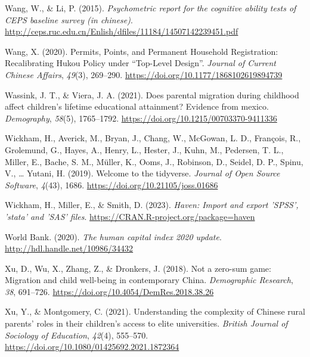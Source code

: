 \documentclass[
  man,floatsintext]{apa7}
\newlength{\cslhangindent}
\newlength{\cslentryspacingunit} %
\newenvironment{CSLReferences}[2] %
 {%
  \setlength{\parindent}{0pt}
  \ifodd #1
  \let\oldpar\par
  \def\par{\hangindent=\cslhangindent\oldpar}
  \fi
  \setlength{\parskip}{#2\cslentryspacingunit}
 }%
 {}
\begin{document}
\begin{CSLReferences}{1}{0}
\leavevmode{}%
Wang, W., \& Li, P. (2015). \emph{Psychometric report for the cognitive ability tests of CEPS baseline survey (in chinese)}. \url{http://ceps.ruc.edu.cn/Enlish/dfiles/11184/14507142239451.pdf}

\leavevmode{}%
Wang, X. (2020). Permits, Points, and Permanent Household Registration: Recalibrating Hukou Policy under {``}Top-Level Design{''}. \emph{Journal of Current Chinese Affairs}, \emph{49}(3), 269--290. \url{https://doi.org/10.1177/1868102619894739}

\leavevmode{}%
Wassink, J. T., \& Viera, J. A. (2021). Does parental migration during childhood affect children's lifetime educational attainment? Evidence from mexico. \emph{Demography}, \emph{58}(5), 1765--1792. \url{https://doi.org/10.1215/00703370-9411336}

\leavevmode{}%
Wickham, H., Averick, M., Bryan, J., Chang, W., McGowan, L. D., François, R., Grolemund, G., Hayes, A., Henry, L., Hester, J., Kuhn, M., Pedersen, T. L., Miller, E., Bache, S. M., Müller, K., Ooms, J., Robinson, D., Seidel, D. P., Spinu, V., \ldots{} Yutani, H. (2019). Welcome to the {tidyverse}. \emph{Journal of Open Source Software}, \emph{4}(43), 1686. \url{https://doi.org/10.21105/joss.01686}

\leavevmode{}%
Wickham, H., Miller, E., \& Smith, D. (2023). \emph{Haven: Import and export 'SPSS', 'stata' and 'SAS' files}. \url{https://CRAN.R-project.org/package=haven}

\leavevmode{}%
World Bank. (2020). \emph{The human capital index 2020 update}. \url{http://hdl.handle.net/10986/34432}

\leavevmode{}%
Xu, D., Wu, X., Zhang, Z., \& Dronkers, J. (2018). Not a zero-sum game: Migration and child well-being in contemporary {China}. \emph{Demographic Research}, \emph{38}, 691--726. \url{https://doi.org/10.4054/DemRes.2018.38.26}

\leavevmode{}%
Xu, Y., \& Montgomery, C. (2021). Understanding the complexity of Chinese rural parents{'} roles in their children{'}s access to elite universities. \emph{British Journal of Sociology of Education}, \emph{42}(4), 555--570. \url{https://doi.org/10.1080/01425692.2021.1872364}


\end{CSLReferences}
\end{document}

